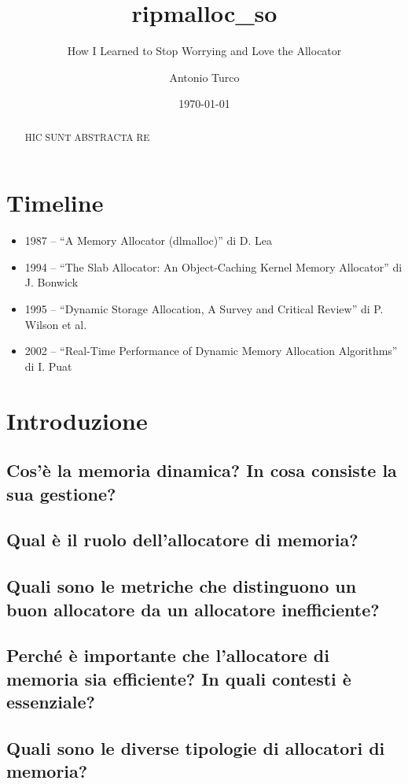 \documentclass[noexaminfo]{sapthesis}
\title{ripmalloc\_so}
\subtitle{How I Learned to Stop Worrying and Love the Allocator}
\author{Antonio Turco}
\date{\today}
\begin{document}
\frontmatter  
\maketitle
\dedication{Dedicato a...}

\begin{abstract}
HIC SUNT ABSTRACTA RE
\end{abstract}

\tableofcontents

\mainmatter 
\chapter*{Timeline}
\begin{itemize}
  \item 1987 – ``A Memory Allocator (dlmalloc)'' di D. Lea
  \item 1994 – ``The Slab Allocator: An Object-Caching Kernel Memory Allocator'' di J. Bonwick
  \item 1995 – ``Dynamic Storage Allocation, A Survey and Critical Review'' di P. Wilson et al.
  \item 2002 – ``Real-Time Performance of Dynamic Memory Allocation Algorithms'' di I. Puat
\end{itemize}

\chapter{Introduzione}
\section{Cos’è la memoria dinamica? In cosa consiste la sua gestione?}
\section{Qual è il ruolo dell’allocatore di memoria?}
\section{Quali sono le metriche che distinguono un buon allocatore da un allocatore inefficiente?}
\section{Perché è importante che l’allocatore di memoria sia efficiente? In quali contesti è essenziale?}
\section{Quali sono le diverse tipologie di allocatori di memoria?}
\end{document}
